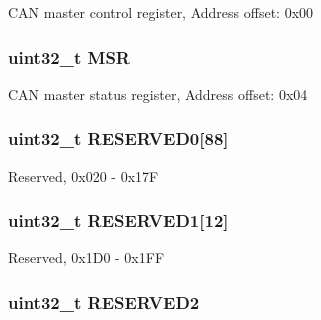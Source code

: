 C\-A\-N master control register, Address offset\-: 0x00 \hypertarget{struct_c_a_n___type_def_acdd4c1b5466be103fb2bb2a225b1d3a9}{
\subsubsection[{M\-S\-R}]{ uint32\-\_\-t M\-S\-R}}\label{struct_c_a_n___type_def_acdd4c1b5466be103fb2bb2a225b1d3a9}
C\-A\-N master status register, Address offset\-: 0x04 \hypertarget{struct_c_a_n___type_def_aae28ab86a4ae57ed057ed1ea89a6d34b}{
\subsubsection[{R\-E\-S\-E\-R\-V\-E\-D0}]{\setlength{\rightskip}{0pt plus 5cm}uint32\-\_\-t R\-E\-S\-E\-R\-V\-E\-D0\mbox{[}88\mbox{]}}}\label{struct_c_a_n___type_def_aae28ab86a4ae57ed057ed1ea89a6d34b}
Reserved, 0x020 -\/ 0x17\-F \hypertarget{struct_c_a_n___type_def_a4bb07a7828fbd5fe86f6a5a3545c177d}{
\subsubsection[{R\-E\-S\-E\-R\-V\-E\-D1}]{\setlength{\rightskip}{0pt plus 5cm}uint32\-\_\-t R\-E\-S\-E\-R\-V\-E\-D1\mbox{[}12\mbox{]}}}\label{struct_c_a_n___type_def_a4bb07a7828fbd5fe86f6a5a3545c177d}
Reserved, 0x1\-D0 -\/ 0x1\-F\-F \hypertarget{struct_c_a_n___type_def_a4c9b972a304c0e08ca27cbe57627c496}{
\subsubsection[{R\-E\-S\-E\-R\-V\-E\-D2}]{\setlength{\rightskip}{0pt plus 5cm}uint32\-\_\-t R\-E\-S\-E\-R\-V\-E\-D2}}\label{struct_c_a_n___type_def_a4c9b972a304c0e08ca27cbe57627c496}
